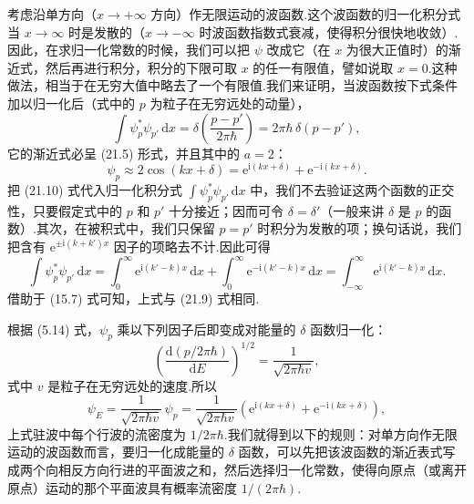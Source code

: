 考虑沿单方向（$x\to+\infty$ 方向）作无限运动的波函数.这个波函数的归一化积分式当 $x\to\infty$ 时是发散的（$x\to-\infty$ 时波函数指数式衰减，使得积分很快地收敛）.因此，在求归一化常数的时候，我们可以把 $\psi$ 改成它（在 $x$ 为很大正值时）的渐近式，然后再进行积分，积分的下限可取 $x$ 的任一有限值，譬如说取 $x=0$.这种做法，相当于在无穷大值中略去了一个有限值.我们来证明，当波函数按下式条件加以归一化后（式中的 $p$ 为粒子在无穷远处的动量），
\begin{equation}
  \int\psi_p^*\psi_{p'}\,\mathrm{d}x
  =\delta\left(\frac{p-p'}{2\pi\hbar}\right)
  =2\pi\hbar\,\delta\left(p-p'\right),
\end{equation}
它的渐近式必呈 (21.5) 形式，并且其中的 $a=2$：
\begin{equation}
  \psi_p\approx 2\cos\left(kx+\delta\right)
  =\mathrm{e}^{\mathrm{i}(kx+\delta)}+\mathrm{e}^{-\mathrm{i}(kx+\delta)}.
\end{equation}
把 (21.10) 式代入归一化积分式 $\int\psi_p^*\psi_{p'}\,\mathrm{d}x$ 中，我们不去验证这两个函数的正交性，只要假定式中的 $p$ 和 $p'$ 十分接近；因而可令 $\delta=\delta'$（一般来讲 $\delta$ 是 $p$ 的函数）.其次，在被积式中，我们只保留 $p=p'$ 时积分为发散的项；换句话说，我们把含有 $\mathrm{e}^{\pm\mathrm{i}(k+k')x}$ 因子的项略去不计.因此可得
\begin{equation*}
  \int\psi_p^*\psi_{p'}\,\mathrm{d}x
  =\int_0^{\infty}\mathrm{e}^{\mathrm{i}(k'-k)x}\,\mathrm{d}x
  +\int_0^{\infty}\mathrm{e}^{-\mathrm{i}(k'-k)x}\,\mathrm{d}x
  =\int_{-\infty}^{\infty}\mathrm{e}^{\mathrm{i}(k'-k)x}\,\mathrm{d}x.
\end{equation*}
借助于 (15.7) 式可知，上式与 (21.9) 式相同.

根据 (5.14) 式，$\psi_p$ 乘以下列因子后即变成对能量的 $\delta$ 函数归一化：
\begin{equation*}
  \left(\frac{\mathrm{d}(p/2\pi\hbar)}{\mathrm{d}E}\right)^{1/2}
  =\frac{1}{\sqrt{2\pi\hbar v}},
\end{equation*}
式中 $v$ 是粒子在无穷远处的速度.所以
\begin{equation}
  \psi_E=\frac{1}{\sqrt{2\pi\hbar v}}\,\psi_p
  =\frac{1}{\sqrt{2\pi\hbar v}}
  \left(\mathrm{e}^{\mathrm{i}(kx+\delta)}
  +\mathrm{e}^{-\mathrm{i}(kx+\delta)}\right),
\end{equation}
上式驻波中每个行波的流密度为 $1/2\pi\hbar$.我们就得到以下的规则：对单方向作无限运动的波函数而言，要归一化成能量的 $\delta$ 函数，可以先把该波函数的渐近表式写成两个向相反方向行进的平面波之和，然后选择归一化常数，使得向原点（或离开原点）运动的那个平面波具有概率流密度 $1/(2\pi\hbar)$.

